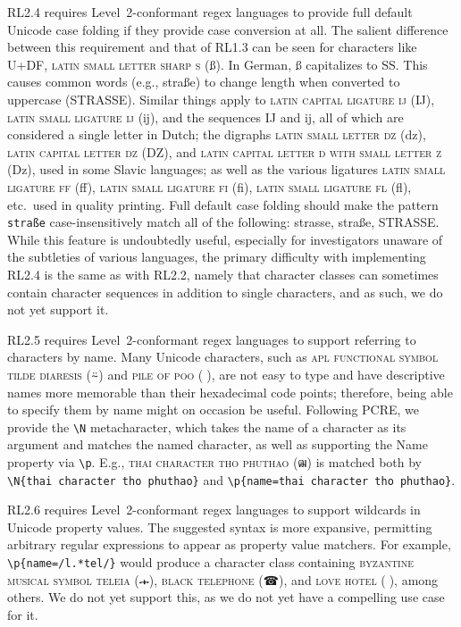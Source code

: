 \documentclass[5p,final,number,sort&compress]{elsarticle}
\newcommand{\re}[1]{\texttt{#1}}
\newcommand*{\whack}{\textbackslash}
\begin{document}
RL2.4 requires Level~2-conformant regex languages to provide full default Unicode case folding if they provide case conversion at all. The salient difference between this requirement and that of RL1.3 can be seen for characters like U+DF, \textsc{latin small letter sharp s} (ß). In German, ß capitalizes to SS. This causes common words (e.g., straße) to change length when converted to uppercase (STRASSE). Similar things apply to \textsc{latin capital ligature ij} (Ĳ), \textsc{latin small ligature ij} (ĳ), and the sequences IJ and ij, all of which are considered a single letter in Dutch; the digraphs \textsc{latin small letter dz} (dz),
\textsc{latin capital letter dz} (DZ),
and \textsc{latin capital letter d with small letter z} (Dz),
used in some Slavic languages; as well as the various ligatures \textsc{latin small ligature ff} (ﬀ), \textsc{latin small ligature fi} (ﬁ), \textsc{latin small ligature fl} (ﬂ), etc.\ used in quality printing. Full default case folding should make the pattern \re{straße} case-insensitively match all of the following: strasse, straße, STRASSE. While this feature is undoubtedly useful, especially for investigators unaware of the subtleties of various languages, the primary difficulty with implementing RL2.4 is the same as with RL2.2, namely that character classes can sometimes contain character sequences in addition to single characters, and as such, we do not yet support it.

RL2.5 requires Level~2-conformant regex languages to support referring to characters by name. Many Unicode characters, such as \textsc{apl functional symbol tilde diaresis} ({\symb ⍨}) and \textsc{pile of poo} ({\symb 💩}), are not easy to type and have descriptive names more memorable than their hexadecimal code points; therefore, being able to specify them by name might on occasion be useful. Following PCRE, we provide the \re{\whack N} metacharacter, which takes the name of a character as its argument and matches the named character, as well as supporting the Name property via \re{\whack p}. E.g., \textsc{thai character tho phuthao} ({ฒ}) is matched both by \re{\whack N\{thai character tho phuthao\}} and \re{\whack p\{name=thai character tho phuthao\}}.

RL2.6 requires Level~2-conformant regex languages to support wildcards in Unicode property values. The suggested syntax is more expansive, permitting arbitrary regular expressions to appear as property value matchers. For example, \re{\whack p\{name=/l.*tel/\}} would produce a character class containing \textsc{byzantine musical symbol teleia} ({\symb 𝀏}), \textsc{black telephone} ({\symb ☎}), and \textsc{love hotel} ({\symb 🏩}), among others. We do not yet support this, as we do not yet have a compelling use case for it.
\end{document}

